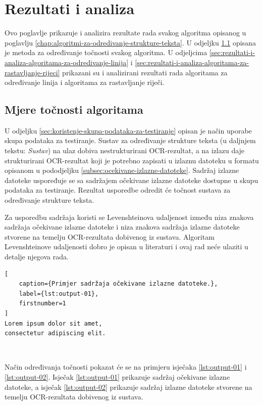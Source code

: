 \documentclass[times, utf8, zavrsni]{fer}
\begin{document}
\chapter{Rezultati i analiza}
Ovo poglavlje prikazuje i analizira rezultate rada svakog algoritma
opisanog u poglavlju \ref{chap:algoritmi-za-odredivanje-strukture-teksta}.
U odjeljku \ref{sec:mjera-tocnosti-algoritama} opisana je metoda
za određivanje točnosti svakog algoritma. U odjeljcima
\ref{sec:rezultati-i-analiza-algoritama-za-odredivanje-linija} i
\ref{sec:rezultati-i-analiza-algoritama-za-rastavljanje-rijeci}
prikazani su i analizirani rezultati rada algoritama za određivanje linija i
algoritama za rastavljanje riječi.








\section{Mjere točnosti algoritama}
\label{sec:mjera-tocnosti-algoritama}
U odjeljku \ref{sec:koristenje-skupa-podataka-za-testiranje} opisan je način
uporabe skupa podataka za testiranje. Sustav za određivanje strukture teksta
(u daljnjem tekstu: \emph{Sustav}) na ulaz dobiva nestrukturirani OCR-rezultat,
a na izlazu daje strukturirani OCR-rezultat koji je potrebno zapisati u izlaznu
datoteku u formatu opisanom u pododjeljku
\ref{subsec:ocekivane-izlazne-datoteke}. Sadržaj izlazne datoteke uspoređuje se
sa sadržajem očekivane izlazne datoteke dostupne u skupu podataka za
testiranje. Rezultat usporedbe odredit će točnost sustava za određivanje
strukture teksta.

Za usporedbu sadržaja koristi se Levenshteinova udaljenost između niza znakova
sadržaja očekivane izlazne datoteke i niza znakova sadržaja izlazne datoteke
stvorene na temelju OCR-rezultata dobivenog iz sustava.
Algoritam Levenshteinove udaljenosti dobro je opisan u literaturi
\citep{cormen2009introduction} i ovaj rad neće ulaziti u detalje njegova rada.

\begin{lstlisting}[
    caption={Primjer sadržaja očekivane izlazne datoteke.},
    label={lst:output-01},
    firstnumber=1
]
Lorem ipsum dolor sit amet,
consectetur adipiscing elit.
\end{lstlisting}

\

Način određivanja točnosti pokazat će se na primjeru isječaka
\ref{lst:output-01} i \ref{lst:output-02}. Isječak \ref{lst:output-01}
prikazuje sadržaj očekivane izlazne datoteke, a isječak \ref{lst:output-02}
prikazuje sadržaj izlazne datoteke stvorene na temelju OCR-rezultata dobivenog
iz sustava.
\end{document}
